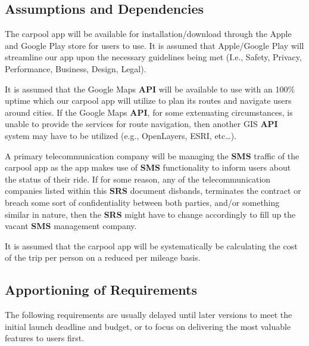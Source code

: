 \documentclass[]{article}
\begin{document}
\subsection{Assumptions and Dependencies}
\label{sub:assumptions_and_dependencies}
The carpool app will be available for installation/download through the Apple and Google Play store for users to use. It is assumed that Apple/Google Play will streamline our app upon the necessary guidelines being met (I.e., Safety, Privacy, Performance, Business, Design, Legal).

It is assumed that the Google Maps \textbf{API} will be available to use with an 100\% uptime which our carpool app will utilize to plan its routes and navigate users around cities. If the Google Maps \textbf{API}, for some extenuating circumstances, is unable to provide the services for route navigation, then another GIS \textbf{API} system may have to be utilized (e.g., OpenLayers, ESRI, etc…).

A primary telecommunication company will be managing the \textbf{SMS} traffic of the carpool app as the app makes use of \textbf{SMS} functionality to inform users about the status of their ride. If for some reason, any of the telecommunication companies listed within this \textbf{SRS} document disbands, terminates the contract or breach some sort of confidentiality between both parties, and/or something similar in nature, then the \textbf{SRS} might have to change accordingly to fill up the vacant \textbf{SMS} management company.

It is assumed that the carpool app will be systematically be calculating the cost of the trip per person on a reduced per mileage basis. 

\subsection{Apportioning of Requirements}
\label{sub:apportioning_of_requirements}
The following requirements are usually delayed until later versions to meet the initial launch deadline and budget, or to focus on delivering the most valuable features to users first.
\end{document}
